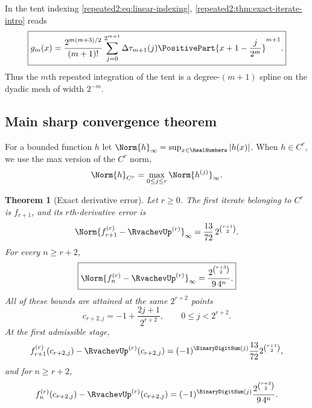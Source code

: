 \documentclass[11pt,oneside]{article}
\newtheorem{theorem}{Theorem}[section]
\theoremstyle{definition}
\theoremstyle{remark}
\begin{document}
In the tent indexing \eqref{repeated2:eq:linear-indexing}, \cref{repeated2:thm:exact-iterate-intro} reads
\begin{equation}
 \boxed{\displaystyle
 g_m(x)=\frac{2^{m(m+3)/2}}{(m+1)!}
 \sum_{j=0}^{2^{m+1}}\Delta\tau_{m+1}(j)
 \PositivePart{x+1-\frac{j}{2^m}}^{m+1}.}
 \label{repeated2:eq:exact-tent-indexing}
\end{equation}
Thus the $m$th repeated integration of the tent is a degree-$(m+1)$ spline on the dyadic
mesh of width $2^{-m}$.

\subsection{Main sharp convergence theorem}

For a bounded function $h$ let $\Norm{h}_\infty=\sup_{x\in\RealNumbers}|h(x)|$.  When $h\in C^r$,
we use the max version of the $C^r$ norm,
\begin{equation}
 \Norm{h}_{C^r}=\max_{0\le j\le r}\Norm{h^{(j)}}_\infty.
 \label{repeated2:eq:Cr-norm}
\end{equation}

\begin{theorem}[Exact derivative error]
\label{repeated2:thm:main-exact-rate-intro}
Let $r\ge0$.
The first iterate belonging to $C^r$ is $f_{r+1}$, and its $r$th-derivative error is
\begin{equation}
 \Norm{f_{r+1}^{(r)}-\RvachevUp^{(r)}}_\infty
 =\frac{13}{72}\,2^{\binom{r+1}{2}}.
 \label{repeated2:eq:first-admissible-error}
\end{equation}
For every $n\ge r+2$,
\begin{equation}
 \boxed{\displaystyle
 \Norm{f_n^{(r)}-\RvachevUp^{(r)}}_\infty
 =\frac{2^{\binom{r+3}{2}}}{9\,4^n}.}
 \label{repeated2:eq:main-exact-rate}
\end{equation}
All of these bounds are attained at the same $2^{r+2}$ points
\begin{equation}
 c_{r+2,j}=-1+\frac{2j+1}{2^{r+2}},
 \qquad 0\le j<2^{r+2}.
 \label{repeated2:eq:error-extremizer-grid}
\end{equation}
At the first admissible stage,
\begin{equation}
 f_{r+1}^{(r)}(c_{r+2,j})-\RvachevUp^{(r)}(c_{r+2,j})
 =(-1)^{\BinaryDigitSum(j)}\frac{13}{72}2^{\binom{r+1}{2}},
 \label{repeated2:eq:signed-first-stage-error}
\end{equation}
and for $n\ge r+2$,
\begin{equation}
 f_n^{(r)}(c_{r+2,j})-\RvachevUp^{(r)}(c_{r+2,j})
 =(-1)^{\BinaryDigitSum(j)}\frac{2^{\binom{r+3}{2}}}{9\,4^n}.
 \label{repeated2:eq:signed-extremizer-error}
\end{equation}
\end{theorem}
\end{document}
